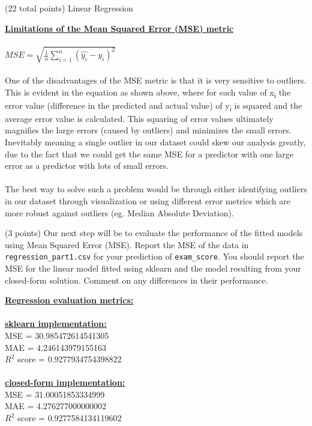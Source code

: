 \documentclass[12pt]{article}
\begin{document}
\begin{question}{(22 total points) Linear Regression}
\begin{subquestion}
\begin{answerbox}{22em}
\large{\textbf{\underline{Limitations of the Mean Squared Error (MSE) metric}}}\\
\\
\normalsize{
$MSE = \sqrt{\frac{1}{n}\sum_{i=1}^{n}(\hat{y_i}-y_i)^2}$\\
\\
One of the disadvantages of the MSE metric is that it is very sensitive to outliers. This is evident in the equation as shown above, where for each value of x\textsubscript{i} the error value (difference in the predicted and actual value) of y\textsubscript{i} is squared and the average error value is calculated. This squaring of error values ultimately magnifies the large errors (caused by outliers) and minimizes the small errors. Inevitably meaning a single outlier in our dataset could skew our analysis greatly, due to the fact that we could get the same MSE for a predictor with one large error as a predictor with lots of small errors.\\
\\
The best way to solve such a problem would be through either identifying outliers in our dataset through visualization or using different error metrics which are more robust against outliers (eg. Median Absolute Deviation).}
\end{answerbox}



\end{subquestion}


 
%
%
\begin{subquestion}{(3 points) Our next step will be to evaluate the performance of the fitted models using Mean Squared Error (MSE). 
Report the MSE of the data in \texttt{regression\_part1.csv} for your prediction of \texttt{exam\_score}.
You should report the MSE for the linear model fitted using sklearn and the model resulting from your closed-form solution. 
Comment on any differences in their performance. 
}


\begin{answerbox}{20em}
\large{\textbf{\underline{Regression evaluation metrics:}}}\\
\\
\normalsize{
\textbf{\underline{sklearn implementation:}}\\
MSE = 30.985472614541305\\
MAE = 4.246143979155163\\
$R^{2}$ score = 0.9277934754398822\\
\\
\textbf{\underline{closed-form implementation:}}\\
MSE = 31.00051853334999\\
MAE = 4.276277000000002\\
$R^{2}$ score = 0.9277584134119602
}
\end{answerbox}




\end{subquestion}
\end{question}
\end{document}
